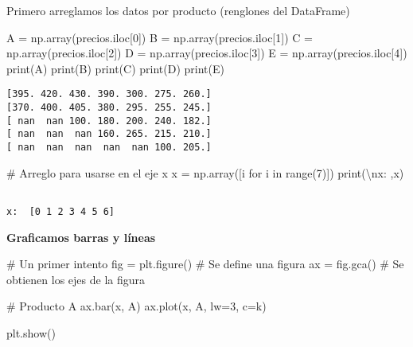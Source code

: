 \documentclass[
  letterpaper,
  DIV=11,
  numbers=noendperiod]{scrreprt}
\newenvironment{Shaded}{\begin{snugshade}}{\end{snugshade}}
\newcommand{\BuiltInTok}[1]{\textcolor[rgb]{0.00,0.23,0.31}{#1}}
\newcommand{\CharTok}[1]{\textcolor[rgb]{0.13,0.47,0.30}{#1}}
\newcommand{\CommentTok}[1]{\textcolor[rgb]{0.37,0.37,0.37}{#1}}
\newcommand{\ControlFlowTok}[1]{\textcolor[rgb]{0.00,0.23,0.31}{#1}}
\newcommand{\DecValTok}[1]{\textcolor[rgb]{0.68,0.00,0.00}{#1}}
\newcommand{\KeywordTok}[1]{\textcolor[rgb]{0.00,0.23,0.31}{#1}}
\newcommand{\NormalTok}[1]{\textcolor[rgb]{0.00,0.23,0.31}{#1}}
\newcommand{\OperatorTok}[1]{\textcolor[rgb]{0.37,0.37,0.37}{#1}}
\newcommand{\StringTok}[1]{\textcolor[rgb]{0.13,0.47,0.30}{#1}}
\begin{document}
Primero arreglamos los datos por producto (renglones del DataFrame)

\begin{Shaded}
\begin{Highlighting}[]
\NormalTok{A }\OperatorTok{=}\NormalTok{ np.array(precios.iloc[}\DecValTok{0}\NormalTok{])}
\NormalTok{B }\OperatorTok{=}\NormalTok{ np.array(precios.iloc[}\DecValTok{1}\NormalTok{])}
\NormalTok{C }\OperatorTok{=}\NormalTok{ np.array(precios.iloc[}\DecValTok{2}\NormalTok{])}
\NormalTok{D }\OperatorTok{=}\NormalTok{ np.array(precios.iloc[}\DecValTok{3}\NormalTok{])}
\NormalTok{E }\OperatorTok{=}\NormalTok{ np.array(precios.iloc[}\DecValTok{4}\NormalTok{])}
\BuiltInTok{print}\NormalTok{(A)}
\BuiltInTok{print}\NormalTok{(B)}
\BuiltInTok{print}\NormalTok{(C)}
\BuiltInTok{print}\NormalTok{(D)}
\BuiltInTok{print}\NormalTok{(E)}
\end{Highlighting}
\end{Shaded}

\begin{verbatim}
[395. 420. 430. 390. 300. 275. 260.]
[370. 400. 405. 380. 295. 255. 245.]
[ nan  nan 100. 180. 200. 240. 182.]
[ nan  nan  nan 160. 265. 215. 210.]
[ nan  nan  nan  nan  nan 100. 205.]
\end{verbatim}

\begin{Shaded}
\begin{Highlighting}[]
\CommentTok{\# Arreglo para usarse en el eje x}
\NormalTok{x }\OperatorTok{=}\NormalTok{ np.array([i }\ControlFlowTok{for}\NormalTok{ i }\KeywordTok{in} \BuiltInTok{range}\NormalTok{(}\DecValTok{7}\NormalTok{)])}
\BuiltInTok{print}\NormalTok{(}\StringTok{\textquotesingle{}}\CharTok{\textbackslash{}n}\StringTok{x: \textquotesingle{}}\NormalTok{,x)}
\end{Highlighting}
\end{Shaded}

\begin{verbatim}

x:  [0 1 2 3 4 5 6]
\end{verbatim}

\textbf{Graficamos barras y líneas}

\begin{Shaded}
\begin{Highlighting}[]
\CommentTok{\# Un primer intento}
\NormalTok{fig }\OperatorTok{=}\NormalTok{ plt.figure() }\CommentTok{\# Se define una figura}
\NormalTok{ax }\OperatorTok{=}\NormalTok{ fig.gca()     }\CommentTok{\# Se obtienen los ejes de la figura}

\CommentTok{\# Producto A}
\NormalTok{ax.bar(x, A)}
\NormalTok{ax.plot(x, A, lw}\OperatorTok{=}\DecValTok{3}\NormalTok{, c}\OperatorTok{=}\StringTok{\textquotesingle{}k\textquotesingle{}}\NormalTok{)}

\NormalTok{plt.show()}
\end{Highlighting}
\end{Shaded}
\end{document}
